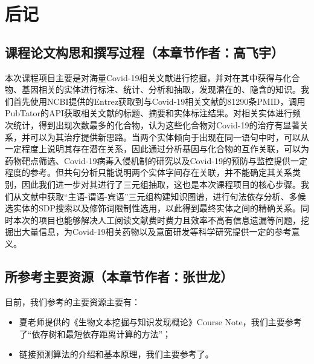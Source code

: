 \documentclass[twocolumn]{article}
\begin{document}
\section{后记}

\subsection{课程论文构思和撰写过程（本章节作者：高飞宇）}
本次课程项目主要是对海量Covid-19相关文献进行挖掘，并对在其中获得与化合物、基因相关的实体进行标注、统计、分析和抽取，发现潜在的、隐含的知识。我们首先使用NCBI提供的Entrez获取到与Covid-19相关文献的81290条PMID，调用PubTator的API获取相关文献的标题、摘要和实体标注结果。对相关实体进行频次统计，得到出现次数最多的化合物，认为这些化合物对Covid-19的治疗有显著关系，并可以为其治疗提供新思路。当两个实体倾向于出现在同一语句中时，可以从一定程度上说明其存在潜在关系，因此通过分析基因与化合物的互作关联，可以为药物靶点筛选、Covid-19病毒入侵机制的研究以及Covid-19的预防与监控提供一定程度的参考。但共句分析只能说明两个实体字间存在关联，并不能确定其关系类别，因此我们进一步对其进行了三元组抽取，这也是本次课程项目的核心步骤。我们从文献中获取“主语-谓语-宾语”三元组构建知识图谱，进行句法依存分析、多候选实体的SDP搜索以及修饰词限制性选用，以此得到最终实体之间的精确关系。同时本次的项目也能够解决人工阅读文献费时费力且效率不高有信息遗漏等问题，挖掘出大量信息，为Covid-19相关药物以及意面研发等科学研究提供一定的参考意义。\par

\subsection{所参考主要资源（本章节作者：张世龙）}
目前，我们参考的主要资源主要有：
\begin{itemize}
	\item 夏老师提供的《生物文本挖掘与知识发现概论》Course Note，我们主要参考了“依存树和最短依存距离计算的方法”；
	\item 链接预测算法的介绍和基本原理，我们主要参考了\cite{link_prediction}。
\end{itemize}
\end{document}
